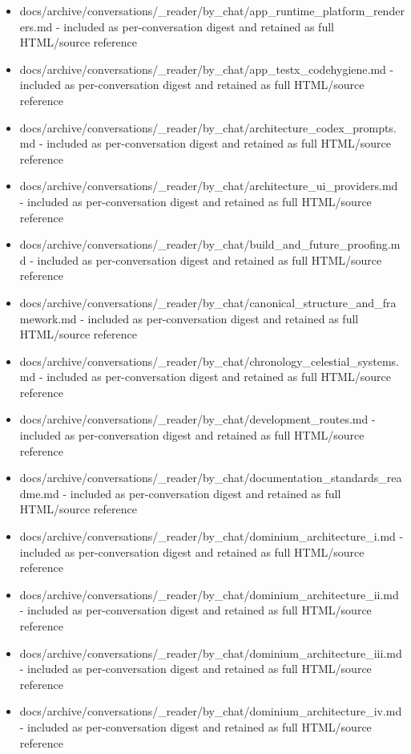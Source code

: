 \documentclass[11pt,a4paper]{report}
\begin{document}
\begin{itemize}
\item docs/archive/conversations/\_reader/by\_chat/app\_runtime\_platform\_renderers.md - included as per-conversation digest and retained as full HTML/source reference
\item docs/archive/conversations/\_reader/by\_chat/app\_testx\_codehygiene.md - included as per-conversation digest and retained as full HTML/source reference
\item docs/archive/conversations/\_reader/by\_chat/architecture\_codex\_prompts.md - included as per-conversation digest and retained as full HTML/source reference
\item docs/archive/conversations/\_reader/by\_chat/architecture\_ui\_providers.md - included as per-conversation digest and retained as full HTML/source reference
\item docs/archive/conversations/\_reader/by\_chat/build\_and\_future\_proofing.md - included as per-conversation digest and retained as full HTML/source reference
\item docs/archive/conversations/\_reader/by\_chat/canonical\_structure\_and\_framework.md - included as per-conversation digest and retained as full HTML/source reference
\item docs/archive/conversations/\_reader/by\_chat/chronology\_celestial\_systems.md - included as per-conversation digest and retained as full HTML/source reference
\item docs/archive/conversations/\_reader/by\_chat/development\_routes.md - included as per-conversation digest and retained as full HTML/source reference
\item docs/archive/conversations/\_reader/by\_chat/documentation\_standards\_readme.md - included as per-conversation digest and retained as full HTML/source reference
\item docs/archive/conversations/\_reader/by\_chat/dominium\_architecture\_i.md - included as per-conversation digest and retained as full HTML/source reference
\item docs/archive/conversations/\_reader/by\_chat/dominium\_architecture\_ii.md - included as per-conversation digest and retained as full HTML/source reference
\item docs/archive/conversations/\_reader/by\_chat/dominium\_architecture\_iii.md - included as per-conversation digest and retained as full HTML/source reference
\item docs/archive/conversations/\_reader/by\_chat/dominium\_architecture\_iv.md - included as per-conversation digest and retained as full HTML/source reference

\end{itemize}
\end{document}
